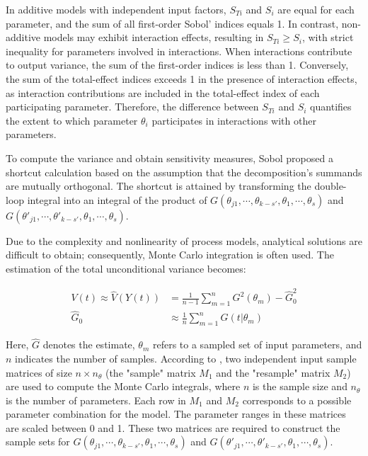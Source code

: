 \documentclass[a4paper,fleqn]{cas-dc}
\begin{document}
		In additive models with independent input factors, $S_{Ti}$ and $S_i$ are equal for each parameter, and the sum of all first-order Sobol’ indices equals 1. In contrast, non-additive models may exhibit interaction effects, resulting in $S_{Ti} \geq S_i$, with strict inequality for parameters involved in interactions. When interactions contribute to output variance, the sum of the first-order indices is less than 1. Conversely, the sum of the total-effect indices exceeds 1 in the presence of interaction effects, as interaction contributions are included in the total-effect index of each participating parameter. Therefore, the difference between $S_{Ti}$ and $S_i$ quantifies the extent to which parameter $\theta_i$ participates in interactions with other parameters.
		
		To compute the variance and obtain sensitivity measures, Sobol proposed a shortcut calculation based on the assumption that the decomposition's summands are mutually orthogonal. The shortcut is attained by transforming the double-loop integral into an integral of the product of $G(\theta_{j1}, \cdots, \theta_{k-s'}, \theta_{1}, \cdots, \theta_{s})$ and $G(\theta'_{j1}, \cdots, \theta'_{k-s'}, \theta_{1}, \cdots, \theta_{s})$.
		
		Due to the complexity and nonlinearity of process models, analytical solutions are difficult to obtain; consequently, Monte Carlo integration is often used. The estimation of the total unconditional variance becomes:
		
		{\footnotesize
			\begin{align}
				V(t) \approx \hat{V}(Y(t)) &= \frac{1}{n-1} \sum_{m=1}^{n} G^2(\theta_m) - \hat{G}_0^2 \\
				\hat{G}_0 &\approx \frac{1}{n} \sum_{m=1}^{n} G(t|\theta_m)
		\end{align}}
		
		Here, $\hat{G}$ denotes the estimate, $\theta_m$ refers to a sampled set of input parameters, and $n$ indicates the number of samples. According to \citet{Saltelli2010}, two independent input sample matrices of size $n \times n_\theta$ (the "sample" matrix $M_1$ and the "resample" matrix $M_2$) are used to compute the Monte Carlo integrals, where $n$ is the sample size and $n_\theta$ is the number of parameters. Each row in $M_1$ and $M_2$ corresponds to a possible parameter combination for the model. The parameter ranges in these matrices are scaled between 0 and 1. These two matrices are required to construct the sample sets for $G(\theta_{j1}, \cdots, \theta_{k-s'}, \theta_{1}, \cdots, \theta_{s})$ and $G(\theta'_{j1}, \cdots, \theta'_{k-s'}, \theta_{1}, \cdots, \theta_{s})$.
		
\end{document}
